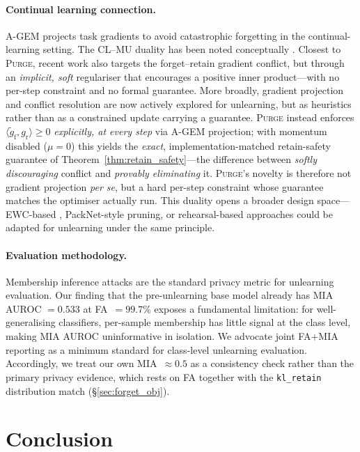 \documentclass[letterpaper]{article} %
\newcommand{\ours}{\textsc{Purge}}
\newcommand{\klr}{\texttt{kl\_retain}}
\newcommand{\gr}{g_{\mathrm{r}}}
\newcommand{\gproj}{\tilde{g}_{\mathrm{f}}}
\begin{document}
\paragraph{Continual learning connection.}
A-GEM \citep{chaudhry2019agem} projects task gradients to avoid catastrophic forgetting in the continual-learning setting.
The CL--MU duality has been noted conceptually \citep{nguyen2020variational,kurmanji2023unbounded}.
Closest to \ours{}, recent work \citep{patel2025learning} also targets the forget--retain gradient conflict, but through an \emph{implicit, soft} regulariser that encourages a positive inner product---with no per-step constraint and no formal guarantee.
More broadly, gradient projection and conflict resolution are now actively explored for unlearning, but as heuristics rather than as a constrained update carrying a guarantee.
\ours{} instead enforces $\langle\gproj,\gr\rangle \ge 0$ \emph{explicitly, at every step} via A-GEM projection; with momentum disabled ($\mu{=}0$) this yields the \emph{exact}, implementation-matched retain-safety guarantee of Theorem~\ref{thm:retain_safety}---the difference between \emph{softly discouraging} conflict and \emph{provably eliminating} it. \ours{}'s novelty is therefore not gradient projection \emph{per se}, but a hard per-step constraint whose guarantee matches the optimiser actually run.
This duality opens a broader design space---EWC-based \citep{golatkar2020eternal}, PackNet-style pruning, or rehearsal-based approaches could be adapted for unlearning under the same principle.

\paragraph{Evaluation methodology.}
Membership inference attacks \citep{shokri2017mia,carlini2022mia} are the standard privacy metric for unlearning evaluation.
Our finding that the pre-unlearning base model already has MIA AUROC $= 0.533$ at FA~$= 99.7$\% exposes a fundamental limitation: for well-generalising classifiers, per-sample membership has little signal at the class level, making MIA AUROC uninformative in isolation.
We advocate joint FA+MIA reporting as a minimum standard for class-level unlearning evaluation.
Accordingly, we treat our own MIA~$\approx 0.5$ as a consistency check rather than the primary privacy evidence, which rests on FA together with the \klr{} distribution match (\S\ref{sec:forget_obj}).

\section{Conclusion}\label{sec:conclusion}
\end{document}
